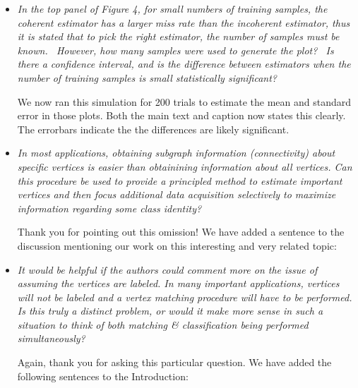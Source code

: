 \begin{itemize}
	\item \emph{In the top panel of Figure 4, for small numbers of training samples, the coherent estimator has a larger miss rate than the incoherent estimator, thus it is stated that to pick the right estimator, the number of samples must be known.  However, how many samples were used to generate the plot?  Is there a confidence interval, and is the difference between estimators when the number of training samples is small statistically significant?}
	
	We now ran this simulation for 200 trials to estimate the mean and standard error in those plots.  Both the main text and caption now states this clearly.  The errorbars indicate the the differences are likely significant.
	
	
	
	\item \emph{In most applications, obtaining subgraph information (connectivity) about specific vertices is easier than obtainining information about all vertices. Can this procedure be used to provide a principled method to estimate important vertices and then focus additional data acquisition selectively to maximize information regarding some class identity?}
	
	Thank you for pointing out this omission!  We have added a sentence to the discussion mentioning our work on this interesting and very related topic:
	

	
	\item \emph{It would be helpful if the authors could comment more on the issue of assuming the vertices are labeled. In many important applications, vertices will not be labeled and a vertex matching procedure will have to be performed. Is this truly a distinct problem, or would it make more sense in such a situation to think of both matching \& classification being performed simultaneously?}
	
	Again, thank you for asking this particular question.  We have added the following sentences to the Introduction:
	
	

\end{itemize}
